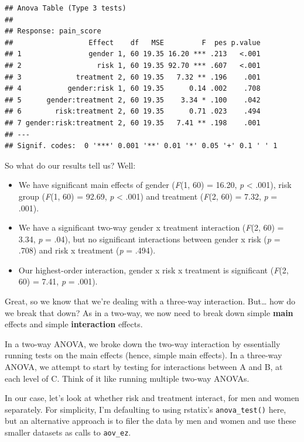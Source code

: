 \documentclass[
]{book}
\begin{document}
\begin{verbatim}
## Anova Table (Type 3 tests)
## 
## Response: pain_score
##                  Effect    df   MSE         F  pes p.value
## 1                gender 1, 60 19.35 16.20 *** .213   <.001
## 2                  risk 1, 60 19.35 92.70 *** .607   <.001
## 3             treatment 2, 60 19.35   7.32 ** .196    .001
## 4           gender:risk 1, 60 19.35      0.14 .002    .708
## 5      gender:treatment 2, 60 19.35    3.34 * .100    .042
## 6        risk:treatment 2, 60 19.35      0.71 .023    .494
## 7 gender:risk:treatment 2, 60 19.35   7.41 ** .198    .001
## ---
## Signif. codes:  0 '***' 0.001 '**' 0.01 '*' 0.05 '+' 0.1 ' ' 1
\end{verbatim}

So what do our results tell us? Well:

\begin{itemize}
\item
  We have significant main effects of gender (\emph{F}(1, 60) = 16.20, \emph{p} \textless{} .001), risk group (\emph{F}(1, 60) = 92.69, \emph{p} \textless{} .001) and treatment (\emph{F}(2, 60) = 7.32, \emph{p} = .001).
\item
  We have a significant two-way gender x treatment interaction (\emph{F}(2, 60) = 3.34, \emph{p} = .04), but no significant interactions between gender x risk (\emph{p} = .708) and risk x treatment (\emph{p} = .494).
\item
  Our highest-order interaction, gender x risk x treatment is significant (\emph{F}(2, 60) = 7.41, \emph{p} = .001).
\end{itemize}

Great, so we know that we're dealing with a three-way interaction. But\ldots{} how do we break that down? As in a two-way, we now need to break down simple \textbf{main} effects and simple \textbf{interaction} effects.

In a two-way ANOVA, we broke down the two-way interaction by essentially running tests on the main effects (hence, simple main effects). In a three-way ANOVA, we attempt to start by testing for interactions between A and B, at each level of C. Think of it like running multiple two-way ANOVAs.

In our case, let's look at whether risk and treatment interact, for men and women separately. For simplicity, I'm defaulting to using rstatix's \texttt{anova\_test()} here, but an alternative approach is to filer the data by men and women and use these smaller datasets as calls to \texttt{aov\_ez}.
\end{document}
